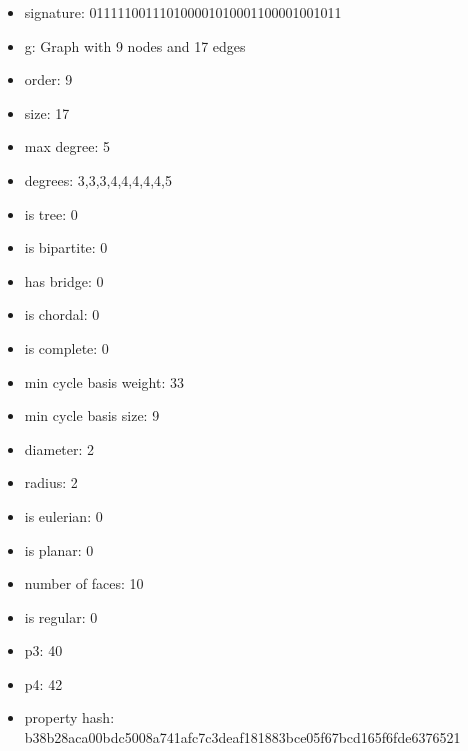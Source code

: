 \newpage
\begin{figure}
\end{figure}
\begin{itemize}
\item signature: 011111001110100001010001100001001011
\item g: Graph with 9 nodes and 17 edges
\item order: 9
\item size: 17
\item max degree: 5
\item degrees: 3,3,3,4,4,4,4,4,5
\item is tree: 0
\item is bipartite: 0
\item has bridge: 0
\item is chordal: 0
\item is complete: 0
\item min cycle basis weight: 33
\item min cycle basis size: 9
\item diameter: 2
\item radius: 2
\item is eulerian: 0
\item is planar: 0
\item number of faces: 10
\item is regular: 0
\item p3: 40
\item p4: 42
\item property hash: b38b28aca00bdc5008a741afc7c3deaf181883bce05f67bcd165f6fde6376521
\end{itemize}
